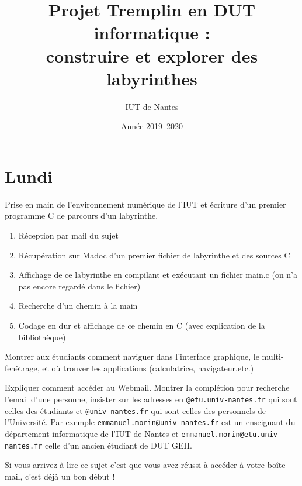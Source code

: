 \documentclass[a4paper]{article}
\title{Projet \textsf{Tremplin en DUT informatique} : \\
construire et explorer des labyrinthes}
\author{IUT de Nantes}
\date{Année 2019--2020}
\newenvironment{objectif}{%
  \begin{framed}%
  \noindent{\bf Objectifs du jour~:}%
}{%
  \end{framed}%
}
\newenvironment{enseignants}[1]{\noindent\color{blue}{\bf #1}}{}
\begin{document}
\maketitle

\section{Lundi}

\begin{objectif}
  Prise en main de l’environnement numérique de l'IUT et écriture d'un premier programme C de parcours d'un labyrinthe.
\end{objectif}

  \begin{enseignants}{Comment ça va se passer~:}
    \begin{enumerate}
    \item Réception par mail du sujet
    \item Récupération sur Madoc d'un premier fichier de labyrinthe et des sources C
    \item Affichage de ce labyrinthe en compilant et exécutant un fichier main.c (on n'a pas encore regardé dans le fichier)
    \item Recherche d'un chemin à la main
    \item Codage en dur et affichage de ce chemin en C (avec explication de la bibliothèque)
    \end{enumerate}
  \end{enseignants}

\begin{enseignants}{Environnement Linux~:}
Montrer aux étudiants comment naviguer dans l’interface graphique, le multi-fenêtrage, et où trouver les applications (calculatrice, navigateur,etc.)
\end{enseignants}

\begin{enseignants}{Webmail~:}
  Expliquer comment accéder au Webmail.
  Montrer la complétion pour recherche l’email d’une personne, insister sur les adresses en \texttt{@etu.univ-nantes.fr} qui sont celles des étudiants et \texttt{@univ-nantes.fr} qui sont celles des personnels de l’Université. Par exemple \texttt{emmanuel.morin@univ-nantes.fr} est un enseignant du département informatique de l’IUT de Nantes et \texttt{emmanuel.morin@etu.univ-nantes.fr} celle d’un ancien étudiant de DUT GEII.
\end{enseignants}

Si vous arrivez à lire ce sujet c’est que vous avez réussi à accéder à votre boîte mail, c’est déjà un bon début !
\end{document}
